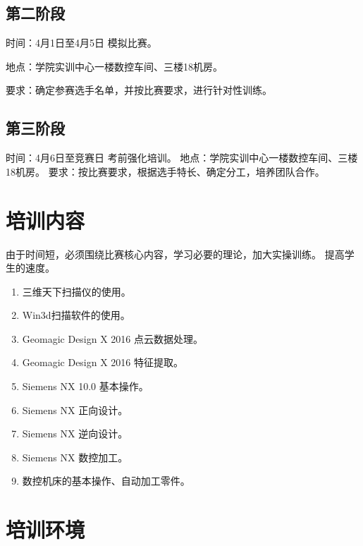 \documentclass[a4paper,zihao=-4,linespread=1.35]{ctexart}
\begin{document}
\subsection{第二阶段}

时间：4月1日至4月5日 模拟比赛。\par
地点：学院实训中心一楼数控车间、三楼18机房。\par
要求：确定参赛选手名单，并按比赛要求，进行针对性训练。\par

\subsection{第三阶段}

时间：4月6日至竞赛日 考前强化培训。
地点：学院实训中心一楼数控车间、三楼18机房。
要求：按比赛要求，根据选手特长、确定分工，培养团队合作。

\section{培训内容}
由于时间短，必须围绕比赛核心内容，学习必要的理论，加大实操训练。
提高学生的速度。\par

\begin{enumerate}[\indent1、]
	\item 三维天下扫描仪的使用。
	\item Win3d扫描软件的使用。
	\item Geomagic Design X 2016 点云数据处理。
	\item Geomagic Design X 2016 特征提取。
	\item Siemens NX 10.0 基本操作。
	\item Siemens NX 正向设计。
	\item  Siemens NX 逆向设计。
	\item Siemens NX 数控加工。
	\item 数控机床的基本操作、自动加工零件。
\end{enumerate}

\section{培训环境}
\end{document}
